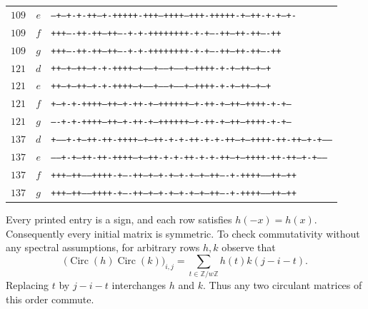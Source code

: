 \documentclass[10pt]{article}
\begin{document}
\begin{center}
\begin{tabular}{rcl}
$109$&$e$&\texttt{--+--+-+-++--+-+++++-+++--++++--+++-+++++-+--++-+-+--+-}\\
$109$&$f$&\texttt{+++----++-++--++----+-+-++++++++-+-+----++--++-++----++}\\
$109$&$g$&\texttt{+++----++-++--++----+-+-++++++++-+-+----++--++-++----++}\\
\hline
$121$&$d$&\texttt{++--+--++--+-+-++++--+-----+------+-----+--++++-+-+--++--+--+}\\
$121$&$e$&\texttt{++--+--++--+-+-++++--+-----+------+-----+--++++-+-+--++--+--+}\\
$121$&$f$&\texttt{+---+-+-++++---++--+-++-+---++++++---+-++-+--++---++++-+-+---}\\
$121$&$g$&\texttt{----+-+-++++---++--+-++-+---++++++---+-++-+--++---++++-+-+---}\\
\hline
$137$&$d$&\texttt{+-----+-+--++-++-++++---+--++-+-+-++-+-+-++--+---++++-++-++--+-+-----}\\
$137$&$e$&\texttt{------+-+--++-++-++++---+--++-+-+-++-+-+-++--+---++++-++-++--+-+-----}\\
$137$&$f$&\texttt{+++--++-----++++-+----++---+---+-+--+-+---+---++----+-++++-----++--++}\\
$137$&$g$&\texttt{+++--++-----++++-+----++---+---+-+--+-+---+---++----+-++++-----++--++}\\
\hline
\end{tabular}
\end{center}

Every printed entry is a sign, and each row satisfies $h(-x)=h(x)$.
Consequently every initial matrix is symmetric. To check commutativity
without any spectral assumptions, for arbitrary rows $h,k$ observe that
\[
 \bigl(\operatorname{Circ}(h)\operatorname{Circ}(k)\bigr)_{i,j}
 =\sum_{t\in\mathbb Z/w\mathbb Z}h(t)k(j-i-t).
\]
Replacing $t$ by $j-i-t$ interchanges $h$ and $k$. Thus any two circulant
matrices of this order commute.
\end{document}
